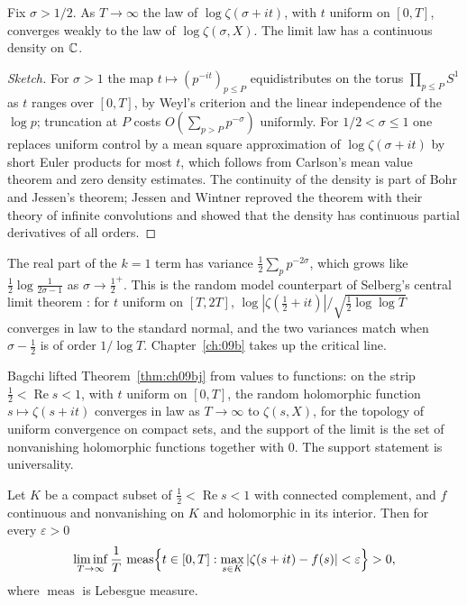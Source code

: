 \begin{theorem}\label{thm:ch09bj}
Fix $\sigma>1/2$. As $T\to\infty$ the law of $\log\zeta(\sigma+it)$, with $t$ uniform on $[0,T]$, converges weakly to the law of $\log\zeta(\sigma,X)$. The limit law has a continuous density on $\mathbb{C}$.
\end{theorem}

\begin{proof}[Sketch]
For $\sigma>1$ the map $t\mapsto (p^{-it})_{p\le P}$ equidistributes on the torus $\prod_{p\le P}S^1$ as $t$ ranges over $[0,T]$, by Weyl's criterion and the linear independence of the $\log p$; truncation at $P$ costs $O(\sum_{p>P}p^{-\sigma})$ uniformly. For $1/2<\sigma\le1$ one replaces uniform control by a mean square approximation of $\log\zeta(\sigma+it)$ by short Euler products for most $t$, which follows from Carlson's mean value theorem and zero density estimates. The continuity of the density is part of Bohr and Jessen's theorem; Jessen and Wintner \cite{jessenwintner1935} reproved the theorem with their theory of infinite convolutions and showed that the density has continuous partial derivatives of all orders.
\end{proof}

The real part of the $k=1$ term has variance $\frac12\sum_p p^{-2\sigma}$, which grows like $\frac12\log\frac{1}{2\sigma-1}$ as $\sigma\to\frac12^+$. This is the random model counterpart of Selberg's central limit theorem \cite{selberg1946}: for $t$ uniform on $[T,2T]$, $\log|\zeta(\frac12+it)|/\sqrt{\frac12\log\log T}$ converges in law to the standard normal, and the two variances match when $\sigma-\frac12$ is of order $1/\log T$. Chapter~\ref{ch:09b} takes up the critical line.

Bagchi \cite{bagchi1981} lifted Theorem~\ref{thm:ch09bj} from values to functions: on the strip $\frac12<\operatorname{Re}s<1$, with $t$ uniform on $[0,T]$, the random holomorphic function $s\mapsto\zeta(s+it)$ converges in law as $T\to\infty$ to $\zeta(s,X)$, for the topology of uniform convergence on compact sets, and the support of the limit is the set of nonvanishing holomorphic functions together with $0$. The support statement is universality.

\begin{theorem}\label{thm:ch09voronin}
Let $K$ be a compact subset of $\frac12<\operatorname{Re}s<1$ with connected complement, and $f$ continuous and nonvanishing on $K$ and holomorphic in its interior. Then for every $\varepsilon>0$
\[
\liminf_{T\to\infty}\frac{1}{T}\,\operatorname{meas}\Bigl\{t\in[0,T]: \max_{s\in K}|\zeta(s+it)-f(s)|<\varepsilon\Bigr\} > 0 ,
\]
where $\operatorname{meas}$ is Lebesgue measure.
\end{theorem}

